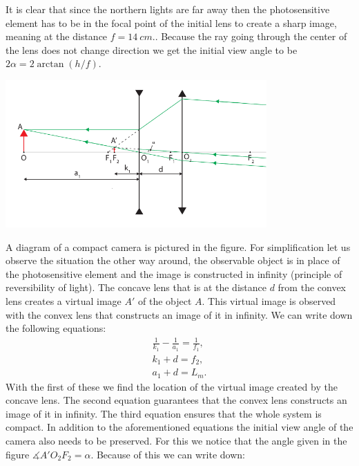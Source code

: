 \documentclass[11pt]{article}
\begin{document}

\solueng
It is clear that since the northern lights are far away then the photosensitive element has to be in the focal point of the initial lens to create a sharp image, meaning at the distance $f=\SI{14}{cm}.$. Because the ray going through the center of the lens does not change direction we get the initial view angle to be $2\alpha=2\arctan\left(h/f\right)$.
\begin{center}
	\includegraphics[width=10cm]{2017-v3g-08-skeem__telephoto}
\end{center}
A diagram of a compact camera is pictured in the figure. For simplification let us observe the situation the other way around, the observable object is in place of the photosensitive element and the image is constructed in infinity (principle of reversibility of light). The concave lens that is at the distance $d$ from the convex lens creates a virtual image $A'$ of the object $A$. This virtual image is observed with the convex lens that constructs an image of it in infinity. We can write down the following equations:
\begin{eqnarray}
\frac{1}{k_{1}}-\frac{1}{a_{1}} = \frac{1}{f_{1}}, \label{2017-v3g-08-eq:telelens-eq1}\\
k_{1}+d = f_{2},\\
a_{1}+d = L_{m}.
\end{eqnarray}
With the first of these we find the location of the virtual image created by the concave lens. The second equation guarantees that the convex lens constructs an image of it in infinity. The third equation ensures that the whole system is compact. In addition to the aforementioned equations the initial view angle of the camera also needs to be preserved. For this we notice that the angle given in the figure $\measuredangle A'O_{2}F_{2}=\alpha$. Because of this we can write down:
\end{document}

